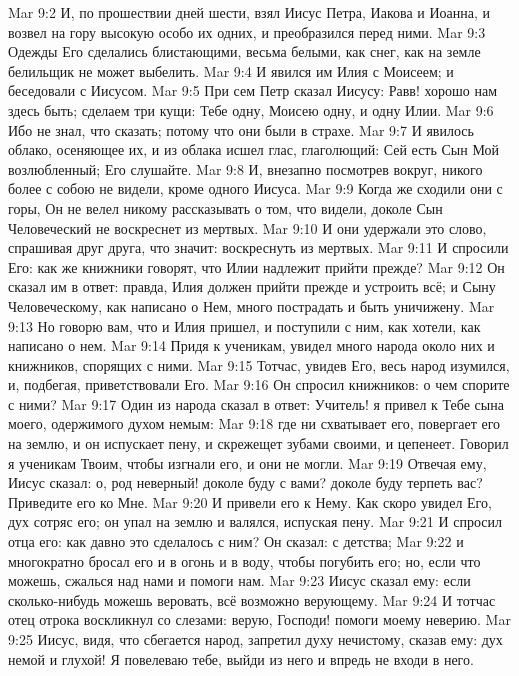 \vs Mar 9:2 И, по прошествии дней шести, взял Иисус Петра, Иакова и Иоанна, и возвел на гору высокую особо их одних, и преобразился перед ними.
\vs Mar 9:3 Одежды Его сделались блистающими, весьма белыми, как снег, как на земле белильщик не может выбелить.
\vs Mar 9:4 И явился им Илия с Моисеем; и беседовали с Иисусом.
\vs Mar 9:5 При сем Петр сказал Иисусу: Равв! хорошо нам здесь быть; сделаем три кущи: Тебе одну, Моисею одну, и одну Илии.
\vs Mar 9:6 Ибо не знал, что сказать; потому что они были в страхе.
\vs Mar 9:7 И явилось облако, осеняющее их, и из облака исшел глас, глаголющий: Сей есть Сын Мой возлюбленный; Его слушайте.
\vs Mar 9:8 И, внезапно посмотрев вокруг, никого более с собою не видели, кроме одного Иисуса.
\vs Mar 9:9 Когда же сходили они с горы, Он не велел никому рассказывать о том, что видели, доколе Сын Человеческий не воскреснет из мертвых.
\vs Mar 9:10 И они удержали это слово, спрашивая друг друга, что значит: воскреснуть из мертвых.
\vs Mar 9:11 И спросили Его: как же книжники говорят, что Илии надлежит прийти прежде?
\vs Mar 9:12 Он сказал им в ответ: правда, Илия должен прийти прежде и устроить всё; и Сыну Человеческому, как написано о Нем,  много пострадать и быть уничижену.
\vs Mar 9:13 Но говорю вам, что и Илия пришел, и поступили с ним, как хотели, как написано о нем.
\rsbpar\vs Mar 9:14 Придя к ученикам, увидел много народа около них и книжников, спорящих с ними.
\vs Mar 9:15 Тотчас, увидев Его, весь народ изумился, и, подбегая, приветствовали Его.
\vs Mar 9:16 Он спросил книжников: о чем спорите с ними?
\vs Mar 9:17 Один из народа сказал в ответ: Учитель! я привел к Тебе сына моего, одержимого духом немым:
\vs Mar 9:18 где ни схватывает его, повергает его на землю, и он испускает пену, и скрежещет зубами своими, и цепенеет. Говорил я ученикам Твоим, чтобы изгнали его, и они не могли.
\vs Mar 9:19 Отвечая ему, Иисус сказал: о, род неверный! доколе буду с вами? доколе буду терпеть вас? Приведите его ко Мне.
\vs Mar 9:20 И привели его к Нему. Как скоро  увидел Его, дух сотряс его; он упал на землю и валялся, испуская пену.
\vs Mar 9:21 И спросил  отца его: как давно это сделалось с ним? Он сказал: с детства;
\vs Mar 9:22 и многократно  бросал его и в огонь и в воду, чтобы погубить его; но, если что можешь, сжалься над нами и помоги нам.
\vs Mar 9:23 Иисус сказал ему: если сколько-нибудь можешь веровать, всё возможно верующему.
\vs Mar 9:24 И тотчас отец отрока воскликнул со слезами: верую, Господи! помоги моему неверию.
\vs Mar 9:25 Иисус, видя, что сбегается народ, запретил духу нечистому, сказав ему: дух немой и глухой! Я повелеваю тебе, выйди из него и впредь не входи в него.
